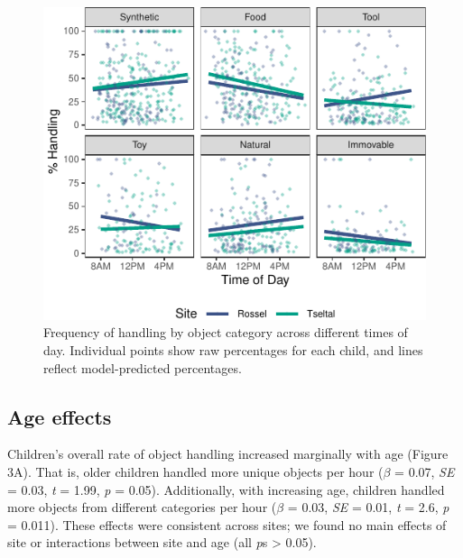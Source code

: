 \documentclass[10pt, letterpaper]{article}
\newenvironment{CodeChunk}{}{}
\begin{document}
\begin{CodeChunk}
\begin{figure}[!ht]

{\centering \includegraphics{figs/tod-effects-fig-1} 

}

\caption[Frequency of handling by object category across different times of day]{Frequency of handling by object category across different times of day. Individual points show raw percentages for each child, and lines reflect model-predicted percentages.}\label{fig:tod-effects-fig}
\end{figure}
\end{CodeChunk}

\hypertarget{age-effects}{%
\subsection{Age effects}\label{age-effects}}

Children's overall rate of object handling increased marginally with age
(Figure 3A). That is, older children handled more unique objects per
hour (\(\beta\) = 0.07, \emph{SE} = 0.03, \emph{t} = 1.99, \emph{p} =
0.05). Additionally, with increasing age, children handled more objects
from different categories per hour (\(\beta\) = 0.03, \emph{SE} = 0.01,
\emph{t} = 2.6, \emph{p} = 0.011). These effects were consistent across
sites; we found no main effects of site or interactions between site and
age (all \emph{p}s \textgreater{} 0.05).
\end{document}
